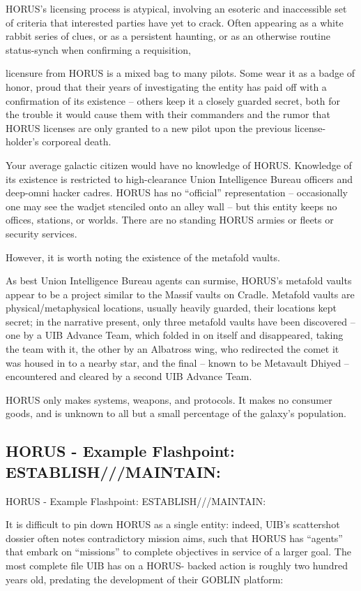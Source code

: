 HORUS’s licensing process is atypical, involving an esoteric and inaccessible set of criteria that
interested parties have yet to crack. Often appearing as a white rabbit series of clues, or as a
persistent haunting, or as an otherwise routine status-synch when confirming a requisition,




licensure from HORUS is a mixed bag to many pilots. Some wear it as a badge of honor, proud
that their years of investigating the entity has paid off with a confirmation of its existence -- others
keep it a closely guarded secret, both for the trouble it would cause them with their commanders
and the rumor that HORUS licenses are only granted to a new pilot upon the previous license-
holder’s corporeal death.

Your average galactic citizen would have no knowledge of HORUS. Knowledge of its existence is
restricted to high-clearance Union Intelligence Bureau officers and deep-omni hacker cadres.
HORUS has no “official” representation -- occasionally one may see the wadjet stenciled onto an
alley wall -- but this entity keeps no offices, stations, or worlds. There are no standing HORUS
armies or fleets or security services.

However, it is worth noting the existence of the metafold vaults.

As best Union Intelligence Bureau agents can surmise, HORUS’s metafold vaults appear to be a
project similar to the Massif vaults on Cradle. Metafold vaults are physical/metaphysical locations,
usually heavily guarded, their locations kept secret; in the narrative present, only three metafold
vaults have been discovered -- one by a UIB Advance Team, which folded in on itself and
disappeared, taking the team with it, the other by an Albatross wing, who redirected the comet it
was housed in to a nearby star, and the final -- known to be Metavault Dhiyed -- encountered and
cleared by a second UIB Advance Team.

HORUS only makes systems, weapons, and protocols. It makes no consumer goods, and is
unknown to all but a small percentage of the galaxy’s population.
\subsection{HORUS - Example Flashpoint: ESTABLISH///MAINTAIN:}
HORUS - Example Flashpoint: ESTABLISH///MAINTAIN:

It is difficult to pin down HORUS as a single entity: indeed, UIB’s scattershot dossier often notes
contradictory mission aims, such that HORUS has “agents” that embark on “missions” to
complete objectives in service of a larger goal. The most complete file UIB has on a HORUS-
backed action is roughly two hundred years old, predating the development of their GOBLIN
platform:


